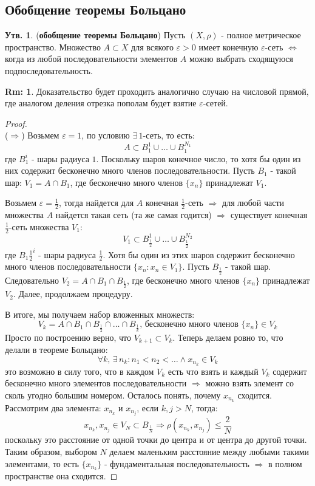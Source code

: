 \documentclass[12pt]{article}
\newcommand{\VE}{\varepsilon}
\theoremstyle{definition}
\newtheorem{rem}{Rm:}
\newtheorem{prop}{Утв.}
\begin{document}
\subsection*{Обобщение теоремы Больцано}
\begin{prop}(\textbf{обобщение теоремы Больцано})
	Пусть $(X,\rho)$ - полное метрическое пространство. Множество $A \subset X$ для всякого $\VE > 0$ имеет конечную $\VE$-сеть $\Leftrightarrow$ когда из любой последовательности элементов $A$ можно выбрать сходящуюся подпоследовательность.
\end{prop}
\begin{rem}
	Доказательство будет проходить аналогично случаю на числовой прямой, где аналогом деления отрезка пополам будет взятие $\VE$-сетей.
\end{rem}
\begin{proof}\hfill\\
	($\Rightarrow$) Возьмем $\VE = 1$, по условию $\exists \, 1$-сеть, то есть: 
	$$
		A \subset B_1^1 \cup \dotsc \cup B_1^{N_1}
	$$
	где $B_1^i$ - шары радиуса $1$. Поскольку шаров конечное число, то хотя бы один из них содержит бесконечно много членов последовательности. Пусть $B_1$ - такой шар: $V_1 = A \cap B_1$, где бесконечно много членов $\{x_n\}$ принадлежат $V_1$. 
	
	Возьмем $\VE = \tfrac{1}{2}$, тогда найдется для $A$ конечная  $\tfrac{1}{2}$-сеть $\Rightarrow$ для любой части множества $A$ найдется такая сеть (та же самая годится) $\Rightarrow$ существует конечная $\tfrac{1}{2}$-сеть множества $V_1$:
	$$
		V_1 \subset B_{\frac{1}{2}}^1 \cup \dotsc \cup B_{\frac{1}{2}}^{N_2}
	$$
	где $B_1{\frac{1}{2}}^i$ - шары радиуса $\tfrac{1}{2}$. Хотя бы один из этих шаров содержит бесконечно много членов последовательности $\{x_n \colon x_n \in V_1\}$. Пусть $B_{\frac{1}{2}}$ - такой шар. Следовательно $V_2 = A \cap B_1 \cap B_{\frac{1}{2}}$, где бесконечно много членов $\{x_n\}$ принадлежат $V_2$. Далее, продолжаем процедуру.
	
	В итоге, мы получаем набор вложенных множеств:
	$$
		V_k = A \cap B_1 \cap B_{\frac{1}{2}} \cap \dotsc \cap B_{\frac{1}{k}}, \, \text{бесконечно много членов } \{x_n\} \in V_k
	$$
	Просто по построению верно, что $V_{k+1} \subset V_k$. Теперь делаем ровно то, что делали в теореме Больцано:
	$$
		\forall k, \, \exists \, n_k \colon n_1 < n_2 < \dotsc \wedge x_{n_k} \in V_k
	$$
	это возможно в силу того, что в каждом $V_k$ есть что взять и каждый $V_k$ содержит бесконечно много элементов последовательности $\Rightarrow$ можно взять элемент со сколь угодно большим номером. Осталось понять, почему $x_{n_k}$ сходится. Рассмотрим два элемента: $x_{n_k}$ и $x_{n_j}$, если $k,j > N$, тогда:  
	$$
		x_{n_k}, x_{n_j} \in V_N \subset B_{\frac{1}{N}} \Rightarrow \rho(x_{n_k},x_{n_j}) \leq \dfrac{2}{N}
	$$ 
	поскольку это расстояние от одной точки до центра и от центра до другой точки. Таким образом, выбором $N$ делаем маленьким расстояние между любыми такими элементами, то есть $\{x_{n_k}\}$ - фундаментальная последовательность $\Rightarrow$ в полном пространстве она сходится.
	

\end{proof}
\end{document}

